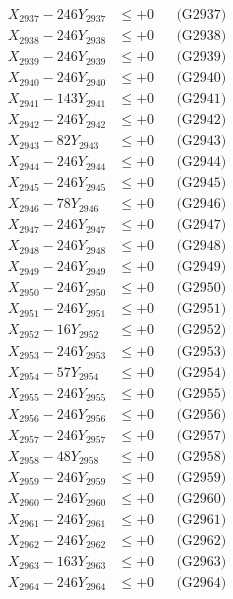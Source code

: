 \documentclass[a4paper,10pt]{article}
\begin{document}
{\begin{align}
X_{2937} - 246Y_{2937} &\leq +0 && \text{(G2937)} \\
X_{2938} - 246Y_{2938} &\leq +0 && \text{(G2938)} \\
X_{2939} - 246Y_{2939} &\leq +0 && \text{(G2939)} \\
X_{2940} - 246Y_{2940} &\leq +0 && \text{(G2940)} \\
\allowbreak
X_{2941} - 143Y_{2941} &\leq +0 && \text{(G2941)} \\
X_{2942} - 246Y_{2942} &\leq +0 && \text{(G2942)} \\
X_{2943} - 82Y_{2943} &\leq +0 && \text{(G2943)} \\
X_{2944} - 246Y_{2944} &\leq +0 && \text{(G2944)} \\
X_{2945} - 246Y_{2945} &\leq +0 && \text{(G2945)} \\
X_{2946} - 78Y_{2946} &\leq +0 && \text{(G2946)} \\
X_{2947} - 246Y_{2947} &\leq +0 && \text{(G2947)} \\
X_{2948} - 246Y_{2948} &\leq +0 && \text{(G2948)} \\
X_{2949} - 246Y_{2949} &\leq +0 && \text{(G2949)} \\
X_{2950} - 246Y_{2950} &\leq +0 && \text{(G2950)} \\
\allowbreak
X_{2951} - 246Y_{2951} &\leq +0 && \text{(G2951)} \\
X_{2952} - 16Y_{2952} &\leq +0 && \text{(G2952)} \\
X_{2953} - 246Y_{2953} &\leq +0 && \text{(G2953)} \\
X_{2954} - 57Y_{2954} &\leq +0 && \text{(G2954)} \\
X_{2955} - 246Y_{2955} &\leq +0 && \text{(G2955)} \\
X_{2956} - 246Y_{2956} &\leq +0 && \text{(G2956)} \\
X_{2957} - 246Y_{2957} &\leq +0 && \text{(G2957)} \\
X_{2958} - 48Y_{2958} &\leq +0 && \text{(G2958)} \\
X_{2959} - 246Y_{2959} &\leq +0 && \text{(G2959)} \\
X_{2960} - 246Y_{2960} &\leq +0 && \text{(G2960)} \\
\allowbreak
X_{2961} - 246Y_{2961} &\leq +0 && \text{(G2961)} \\
X_{2962} - 246Y_{2962} &\leq +0 && \text{(G2962)} \\
X_{2963} - 163Y_{2963} &\leq +0 && \text{(G2963)} \\
X_{2964} - 246Y_{2964} &\leq +0 && \text{(G2964)} \\

\end{align}}
\end{document}
